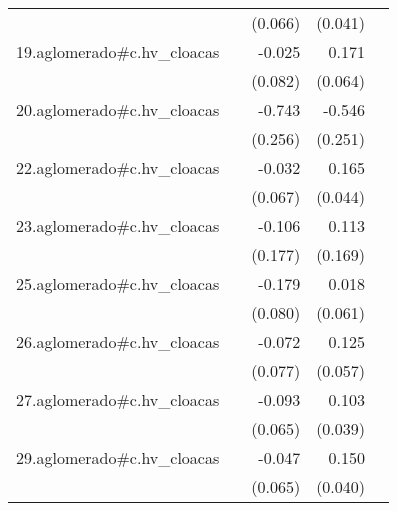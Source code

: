 {\begin{longtable}{l*{4}{D{.}{.}{-1}}}
            &                     &     (0.066)         &     (0.041)         &                     \\
\addlinespace
19.aglomerado#c.hv\_cloacas&                     &      -0.025         &       0.171\sym{**} &                     \\
            &                     &     (0.082)         &     (0.064)         &                     \\
\addlinespace
20.aglomerado#c.hv\_cloacas&                     &      -0.743\sym{**} &      -0.546\sym{*}  &                     \\
            &                     &     (0.256)         &     (0.251)         &                     \\
\addlinespace
22.aglomerado#c.hv\_cloacas&                     &      -0.032         &       0.165\sym{***}&                     \\
            &                     &     (0.067)         &     (0.044)         &                     \\
\addlinespace
23.aglomerado#c.hv\_cloacas&                     &      -0.106         &       0.113         &                     \\
            &                     &     (0.177)         &     (0.169)         &                     \\
\addlinespace
25.aglomerado#c.hv\_cloacas&                     &      -0.179\sym{*}  &       0.018         &                     \\
            &                     &     (0.080)         &     (0.061)         &                     \\
\addlinespace
26.aglomerado#c.hv\_cloacas&                     &      -0.072         &       0.125\sym{*}  &                     \\
            &                     &     (0.077)         &     (0.057)         &                     \\
\addlinespace
27.aglomerado#c.hv\_cloacas&                     &      -0.093         &       0.103\sym{**} &                     \\
            &                     &     (0.065)         &     (0.039)         &                     \\
\addlinespace
29.aglomerado#c.hv\_cloacas&                     &      -0.047         &       0.150\sym{***}&                     \\
            &                     &     (0.065)         &     (0.040)         &                     \\

\end{longtable}}
